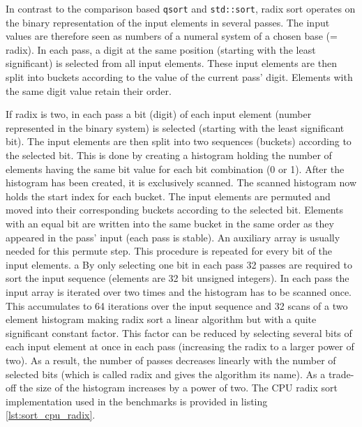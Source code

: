In contrast to the comparison based \lstinline!qsort! and \lstinline!std::sort!, radix sort operates on the binary representation of the input elements in several passes. The input values are therefore seen as numbers of a numeral system of a chosen base (= radix). In each pass, a digit at the same position (starting with the least significant) is selected from all input elements. These input elements are then split into buckets according to the value of the current pass' digit. Elements with the same digit value retain their order.

If radix is two, in each pass a bit (digit) of each input element (number represented in the binary system) is selected (starting with the least significant bit). The input elements are then split into two sequences (buckets) according to the selected bit. This is done by creating a histogram holding the number of elements having the same bit value for each bit combination (0 or 1). After the histogram has been created, it is exclusively scanned. The scanned histogram now holds the start index for each bucket. The input elements are permuted and moved into their corresponding buckets according to the selected bit. Elements with an equal bit are written into the same bucket in the same order as they appeared in the pass' input (each pass is stable). An auxiliary array is usually needed for this permute step. This procedure is repeated for every bit of the input elements. 
a
By only selecting one bit in each pass 32 passes are required to sort the input sequence (elements are 32 bit unsigned integers). In each pass the input array is iterated over two times and the histogram has to be scanned once. This accumulates to 64 iterations over the input sequence and 32 scans of a two element histogram making radix sort a linear algorithm but with a quite significant constant factor. This factor can be reduced by selecting several bits of each input element at once in each pass (increasing the radix to a larger power of two). As a result, the number of passes decreases linearly with the number of selected bits (which is called radix and gives the algorithm its name). As a trade-off the size of the histogram increases by a power of two.
The CPU radix sort implementation used in the benchmarks is provided in listing \ref{lst:sort_cpu_radix}.



